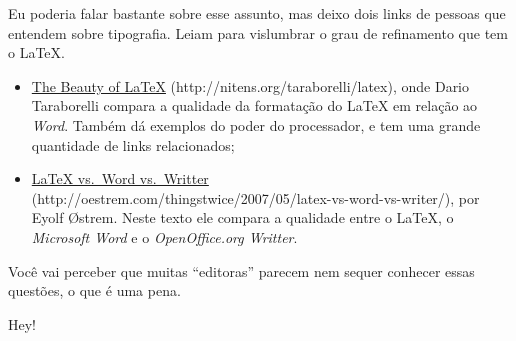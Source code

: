 Eu poderia falar bastante sobre esse assunto, mas deixo dois links de pessoas que entendem sobre tipografia. Leiam para vislumbrar o grau de refinamento que tem o \LaTeX.

\begin{itemize}
	\item \href{http://nitens.org/taraborelli/latex}{The Beauty of \LaTeX} ({\sf http://nitens.org/taraborelli/latex}), onde Dario Taraborelli compara a qualidade da formatação do \LaTeX{} em relação ao \emph{Word}. Também dá exemplos do poder do processador, e tem uma grande quantidade de links relacionados;
	\item \href{http://oestrem.com/thingstwice/2007/05/latex-vs-word-vs-writer/}{\LaTeX{} vs.~Word vs.~Writter} (\textsf{http://oestrem.com/thingstwice/2007/05/latex-vs-word-vs-writer/}), por Eyolf \O strem. Neste texto ele compara a qualidade entre o \LaTeX{}, o \emph{Microsoft Word} e o \emph{OpenOffice.org Writter}.
\end{itemize}

Você vai perceber que muitas ``editoras'' parecem nem sequer conhecer essas questões, o que é uma pena.

Hey!
